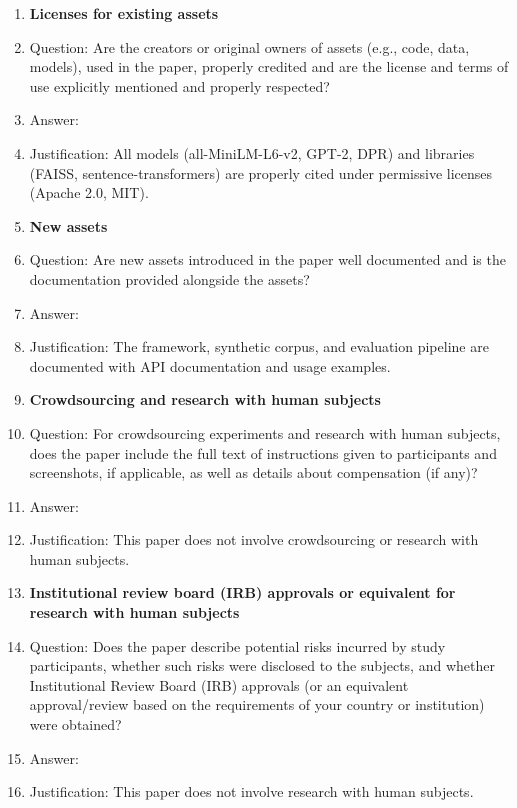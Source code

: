 \begin{enumerate}
\item {\bf Licenses for existing assets}
    \item[] Question: Are the creators or original owners of assets (e.g., code, data, models), used in the paper, properly credited and are the license and terms of use explicitly mentioned and properly respected?
    \item[] Answer: \answerYes{}
    \item[] Justification: All models (all-MiniLM-L6-v2, GPT-2, DPR) and libraries (FAISS, sentence-transformers) are properly cited under permissive licenses (Apache 2.0, MIT).

\item {\bf New assets}
    \item[] Question: Are new assets introduced in the paper well documented and is the documentation provided alongside the assets?
    \item[] Answer: \answerYes{}
    \item[] Justification: The \memsad{} framework, synthetic corpus, and evaluation pipeline are documented with API documentation and usage examples.

\item {\bf Crowdsourcing and research with human subjects}
    \item[] Question: For crowdsourcing experiments and research with human subjects, does the paper include the full text of instructions given to participants and screenshots, if applicable, as well as details about compensation (if any)?
    \item[] Answer: \answerNA{}
    \item[] Justification: This paper does not involve crowdsourcing or research with human subjects.

\item {\bf Institutional review board (IRB) approvals or equivalent for research with human subjects}
    \item[] Question: Does the paper describe potential risks incurred by study participants, whether such risks were disclosed to the subjects, and whether Institutional Review Board (IRB) approvals (or an equivalent approval/review based on the requirements of your country or institution) were obtained?
    \item[] Answer: \answerNA{}
    \item[] Justification: This paper does not involve research with human subjects.


\end{enumerate}
